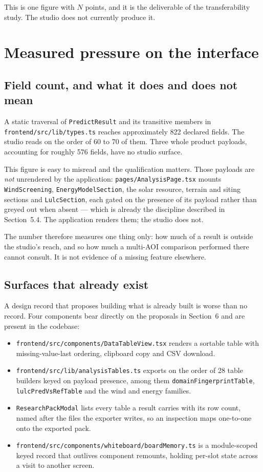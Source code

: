 \documentclass[11pt,a4paper]{article}
\newcommand{\code}[1]{\texttt{\small #1}}
\begin{document}
This is one figure with $N$ points, and it is the deliverable of the
transferability study. The studio does not currently produce it.

\section{Measured pressure on the interface}

\subsection{Field count, and what it does and does not mean}

A static traversal of \code{PredictResult} and its transitive members in
\code{frontend/src/lib/types.ts} reaches approximately 822 declared fields. The
studio reads on the order of 60 to 70 of them. Three whole product payloads,
accounting for roughly 576 fields, have no studio surface.

This figure is easy to misread and the qualification matters. Those payloads are
\emph{not} unrendered by the application: \code{pages/AnalysisPage.tsx} mounts
\code{WindScreening}, \code{EnergyModelSection}, the solar resource, terrain and
siting sections and \code{LulcSection}, each gated on the presence of its
payload rather than greyed out when absent --- which is already the discipline
described in Section~5.4. The application renders them; the studio does not.

The number therefore measures one thing only: how much of a result is outside
the studio's reach, and so how much a multi-AOI comparison performed there
cannot consult. It is not evidence of a missing feature elsewhere.

\subsection{Surfaces that already exist}
\label{sec:existing}

A design record that proposes building what is already built is worse than no
record. Four components bear directly on the proposals in Section~6 and are
present in the codebase:

\begin{itemize}
\item \code{frontend/src/components/DataTableView.tsx} renders a sortable table
      with missing-value-last ordering, clipboard copy and CSV download.
\item \code{frontend/src/lib/analysisTables.ts} exports on the order of 28 table
      builders keyed on payload presence, among them
      \code{domainFingerprintTable}, \code{lulcPredVsRefTable} and the
      wind and energy families.
\item \code{ResearchPackModal} lists every table a result carries with its row
      count, named after the files the exporter writes, so an inspection maps
      one-to-one onto the exported pack.
\item \code{frontend/src/components/whiteboard/boardMemory.ts} is a
      module-scoped keyed record that outlives component remounts, holding
      per-slot state across a visit to another screen.
\end{itemize}
\end{document}
